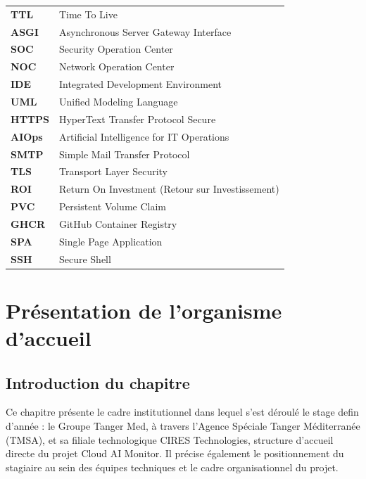 \documentclass[11pt,a4paper]{report}
\begin{document}
\begin{center}
\begin{tabular}{p{3cm} p{11cm}}
\textbf{TTL} & Time To Live \\
\textbf{ASGI} & Asynchronous Server Gateway Interface \\
\textbf{SOC} & Security Operation Center \\
\textbf{NOC} & Network Operation Center \\
\textbf{IDE} & Integrated Development Environment \\
\textbf{UML} & Unified Modeling Language \\
\textbf{HTTPS} & HyperText Transfer Protocol Secure \\
\textbf{AIOps} & Artificial Intelligence for IT Operations \\
\textbf{SMTP} & Simple Mail Transfer Protocol \\
\textbf{TLS} & Transport Layer Security \\
\textbf{ROI} & Return On Investment (Retour sur Investissement) \\
\textbf{PVC} & Persistent Volume Claim \\
\textbf{GHCR} & GitHub Container Registry \\
\textbf{SPA} & Single Page Application \\
\textbf{SSH} & Secure Shell \\
\end{tabular}
\end{center}

\newpage
\tableofcontents
\listoffigures
\listoftables

\clearpage
{}
\setcounter{page}{1}

\chapter{Présentation de l'organisme d'accueil}

\section*{Introduction du chapitre}

Ce chapitre présente le cadre institutionnel dans lequel s'est déroulé le
stage defin d'année : le Groupe Tanger Med, à travers l'Agence Spéciale
Tanger Méditerranée (TMSA), et sa filiale technologique CIRES Technologies,
structure d'accueil directe du projet Cloud AI Monitor. Il précise également
le positionnement du stagiaire au sein des équipes techniques et le cadre
organisationnel du projet.
\end{document}
